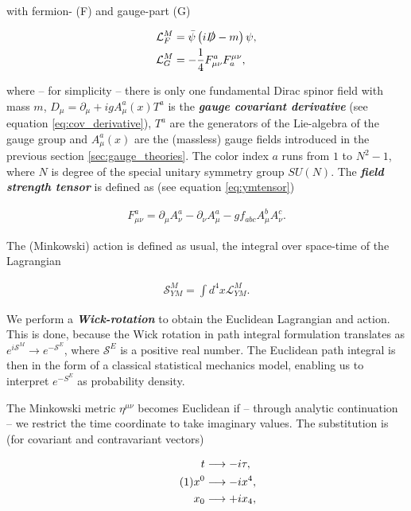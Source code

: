 \documentclass{article}
\newcommand\numberthis{\addtocounter{equation}{1}\tag{\theequation}}
\theoremstyle{plain} %
\theoremstyle{convention} %
\theoremstyle{remark} %
\def\df#1{\textbf{\textit{#1}}}
\numberwithin{equation}{section}
\begin{document}
with fermion- (F) and gauge-part (G)

\begin{align*}
    \mathcal{L}_F^M &= \bar{\psi} \left( i \slashed{D} - m \right) \psi, \\
    \mathcal{L}_G^M &= - \frac{1}{4} F_{\mu \nu}^a F_a^{\mu \nu},
\end{align*}

where -- for simplicity -- there is only one fundamental Dirac spinor field with mass $m$, $D_{\mu} = \partial_{\mu} + ig A_{\mu}^a(x) T^a$ is the \df{gauge covariant derivative} (see equation \eqref{eq:cov_derivative}), $T^a$ are the generators of the Lie-algebra of the gauge group and $A_{\mu}^a(x)$ are the (massless) gauge fields introduced in the previous section \ref{sec:gauge_theories}. The color index $a$ runs from $1$ to $N^2-1$, where $N$ is degree of the special unitary symmetry group $SU(N)$. The \df{field strength tensor} is defined as (see equation \eqref{eq:ymtensor})

\begin{align*}
    F_{\mu \nu}^a = \partial_{\mu} A_{\nu}^a - \partial_{\nu} A_{\mu}^a - g f_{abc} A_{\mu}^b A_{\nu}^c.
\end{align*}

The (Minkowski) action is defined as usual, the integral over space-time of the Lagrangian

\begin{align*}
    \mathcal{S}_{YM}^M = \int d^4x \mathcal{L}_{YM}^M.
\end{align*}

We perform a \df{Wick-rotation} to obtain the Euclidean Lagrangian and action. This is done, because the Wick rotation in path integral formulation translates as $e^{i \mathcal{S}^M} \to e^{-\mathcal{S}^E}$, where $\mathcal{S}^E$ is a positive real number. The Euclidean path integral is then in the form of a classical statistical mechanics model, enabling us to interpret $e^{-S^E}$ as probability density.

The Minkowski metric $\eta^{\mu \nu}$ becomes Euclidean if -- through analytic continuation -- we restrict the time coordinate to take imaginary values. The substitution is (for covariant and contravariant vectors)

\begin{align*}
    t &\longrightarrow - i \tau, \\ \numberthis \label{eq:wick}
    x^0 &\longrightarrow - i x^4, \\
    x_0 &\longrightarrow + i x_4,
\end{align*}
\end{document}
